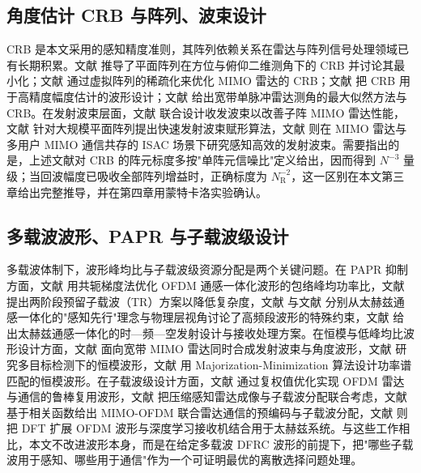 \subsection{角度估计 CRB 与阵列、波束设计}
CRB 是本文采用的感知精度准则，其阵列依赖关系在雷达与阵列信号处理领域已有长期积累。文献\cite{peshkov2019estimationan} 推导了平面阵列在方位与俯仰二维测角下的 CRB 并讨论其最小化；文献\cite{li2021thinnedvirtu} 通过虚拟阵列的稀疏化来优化 MIMO 雷达的 CRB；文献\cite{huang2025acramrraobou} 把 CRB 用于高精度幅度估计的波形设计；文献\cite{wang2018maximumlikel} 给出宽带单脉冲雷达测角的最大似然方法与 CRB。在发射波束层面，文献\cite{zhou2019jointdesigno} 联合设计收发波束以改善子阵 MIMO 雷达性能，文献\cite{liu2020fasttransmit} 针对大规模平面阵列提出快速发射波束赋形算法，文献\cite{liu2024sensingeffic} 则在 MIMO 雷达与多用户 MIMO 通信共存的 ISAC 场景下研究感知高效的发射波束。需要指出的是，上述文献对 CRB 的阵元标度多按"单阵元信噪比"定义给出，因而得到 $N^{-3}$ 量级；当回波幅度已吸收全部阵列增益时，正确标度为 $N_{\mathrm{R}}^{-2}$，这一区别在本文第三章给出完整推导，并在第四章用蒙特卡洛实验确认。

\subsection{多载波波形、PAPR 与子载波级设计}
多载波体制下，波形峰均比与子载波级资源分配是两个关键问题。在 PAPR 抑制方面，文献\cite{rong2022highefficien} 用共轭梯度法优化 OFDM 通感一体化波形的包络峰均功率比，文献\cite{tu2023anovellowcom} 提出两阶段预留子载波（TR）方案以降低复杂度，文献\cite{han2026terahertzint} 与文献\cite{han2024thzisacaphys} 分别从太赫兹通感一体化的"感知先行"理念与物理层视角讨论了高频段波形的特殊约束，文献\cite{wu2025timefrequenc} 给出太赫兹通感一体化的时—频—空发射设计与接收处理方案。在恒模与低峰均比波形设计方面，文献\cite{zheng2025constantmodu} 面向宽带 MIMO 雷达同时合成发射波束与角度波形，文献\cite{liu2019constantmodu} 研究多目标检测下的恒模波形，文献\cite{zheng2025designofcons} 用 Majorization-Minimization 算法设计功率谱匹配的恒模波形。在子载波级设计方面，文献\cite{wang2023robustmultip} 通过复权值优化实现 OFDM 雷达与通信的鲁棒复用波形，文献\cite{hwang2021compressives} 把压缩感知雷达成像与子载波分配联合考虑，文献\cite{wu2026correlationf} 基于相关函数给出 MIMO-OFDM 联合雷达通信的预编码与子载波分配，文献\cite{wu2023sensinginteg} 则把 DFT 扩展 OFDM 波形与深度学习接收机结合用于太赫兹系统。与这些工作相比，本文不改进波形本身，而是在给定多载波 DFRC 波形的前提下，把"哪些子载波用于感知、哪些用于通信"作为一个可证明最优的离散选择问题处理。

